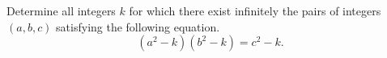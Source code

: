 Determine all integers $k$ for which there exist infinitely the pairs of integers $(a,b,c)$ satisfying the following equation.\[ (a^2-k)(b^2-k)=c^2-k.  \]